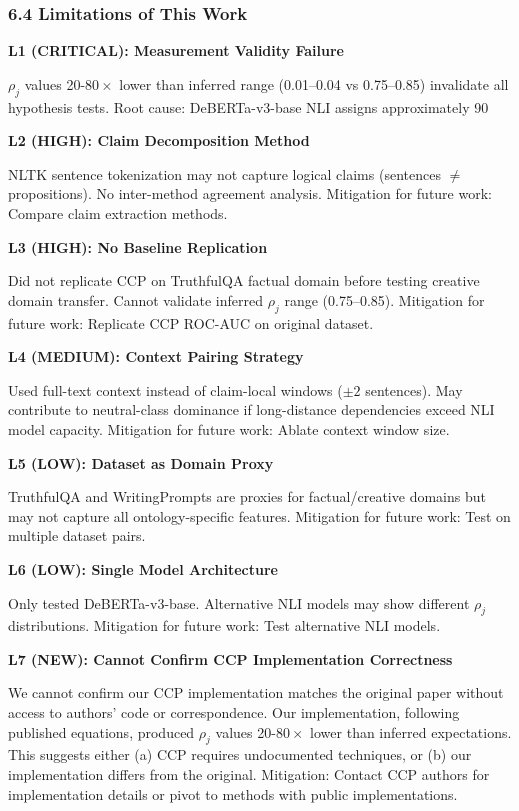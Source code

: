 \subsubsection{6.4 Limitations of This Work}

\textbf{L1 (CRITICAL): Measurement Validity Failure}

$\rho_j$ values 20-$80\times$ lower than inferred range (0.01--0.04 vs 0.75--0.85) invalidate all hypothesis tests. Root cause: DeBERTa-v3-base NLI assigns approximately 90%

\textbf{L2 (HIGH): Claim Decomposition Method}

NLTK sentence tokenization may not capture logical claims (sentences $\neq$ propositions). No inter-method agreement analysis. Mitigation for future work: Compare claim extraction methods.

\textbf{L3 (HIGH): No Baseline Replication}

Did not replicate CCP on TruthfulQA factual domain before testing creative domain transfer. Cannot validate inferred $\rho_j$ range (0.75--0.85). Mitigation for future work: Replicate CCP ROC-AUC on original dataset.

\textbf{L4 (MEDIUM): Context Pairing Strategy}

Used full-text context instead of claim-local windows ($\pm 2$ sentences). May contribute to neutral-class dominance if long-distance dependencies exceed NLI model capacity. Mitigation for future work: Ablate context window size.

\textbf{L5 (LOW): Dataset as Domain Proxy}

TruthfulQA and WritingPrompts are proxies for factual/creative domains but may not capture all ontology-specific features. Mitigation for future work: Test on multiple dataset pairs.

\textbf{L6 (LOW): Single Model Architecture}

Only tested DeBERTa-v3-base. Alternative NLI models may show different $\rho_j$ distributions. Mitigation for future work: Test alternative NLI models.

\textbf{L7 (NEW): Cannot Confirm CCP Implementation Correctness}

We cannot confirm our CCP implementation matches the original paper without access to authors' code or correspondence. Our implementation, following published equations, produced $\rho_j$ values 20-$80\times$ lower than inferred expectations. This suggests either (a) CCP requires undocumented techniques, or (b) our implementation differs from the original. Mitigation: Contact CCP authors for implementation details or pivot to methods with public implementations.

